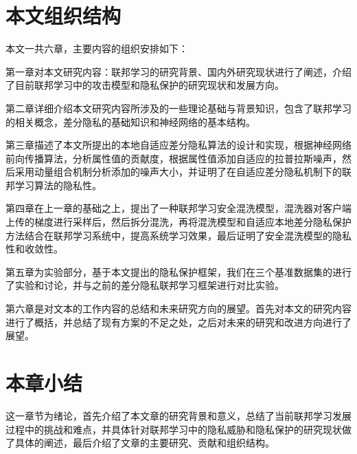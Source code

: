 \section{本文组织结构}

本文一共六章，主要内容的组织安排如下：

第一章对本文研究内容：联邦学习的研究背景、国内外研究现状进行了阐述，介绍了目前联邦学习中的攻击模型和隐私保护的研究现状和发展方向。

第二章详细介绍本文研究内容所涉及的一些理论基础与背景知识，包含了联邦学习的相关概念，差分隐私的基础知识和神经网络的基本结构。

第三章描述了本文所提出的本地自适应差分隐私算法的设计和实现，根据神经网络前向传播算法，分析属性值的贡献度，根据属性值添加自适应的拉普拉斯噪声，然后采用动量组合机制分析添加的噪声大小，并证明了在自适应差分隐私机制下的联邦学习算法的隐私性。
  
第四章在上一章的基础之上，提出了一种联邦学习安全混洗模型，混洗器对客户端上传的梯度进行采样后，然后拆分混洗，再将混洗模型和自适应本地差分隐私保护方法结合在联邦学习系统中，提高系统学习效果，最后证明了安全混洗模型的隐私性和收敛性。
    
第五章为实验部分，基于本文提出的隐私保护框架，我们在三个基准数据集的进行了实验和讨论，并与之前的差分隐私联邦学习框架进行对比实验。

第六章是对文本的工作内容的总结和未来研究方向的展望。首先对本文的研究内容进行了概括，并总结了现有方案的不足之处，之后对未来的研究和改进方向进行了展望。

\section{本章小结}
这一章节为绪论，首先介绍了本文章的研究背景和意义，总结了当前联邦学习发展过程中的挑战和难点，并具体针对联邦学习中的隐私威胁和隐私保护的研究现状做了具体的阐述，最后介绍了文章的主要研究、贡献和组织结构。

